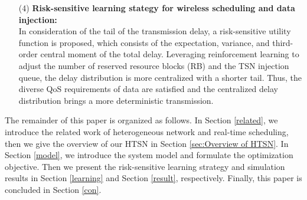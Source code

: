 \documentclass{SCIS2021}
\begin{document}
	\begin{itemize}[itemsep= 15 pt,topsep = -0 pt]
		\item[(4)]
		\textbf{Risk-sensitive learning stategy for wireless scheduling and data injection:}\\
		In consideration of the tail of the transmission delay, a risk-sensitive utility function is proposed, which consists of the expectation, variance, and third-order central moment of the total delay. Leveraging reinforcement learning to adjust the number of reserved resource blocks (RB) and the TSN injection queue, the delay distribution is more centralized with a shorter tail. Thus, the diverse QoS requirements of data are satisfied and the centralized delay distribution brings a more deterministic transmission.
	\end{itemize}

	{\color{blue}The remainder of this paper is organized as follows. In Section \ref{related}, we introduce the related work of heterogeneous network and real-time scheduling, then we give the overview of our HTSN in Section \ref{sec:Overview of HTSN}. In Section \ref{model}, we introduce the system model and formulate the optimization objective. Then we present the risk-sensitive learning strategy and simulation results in Section \ref{learning} and Section \ref{result}, respectively. Finally, this paper is concluded in Section \ref{con}.}
\end{document}
